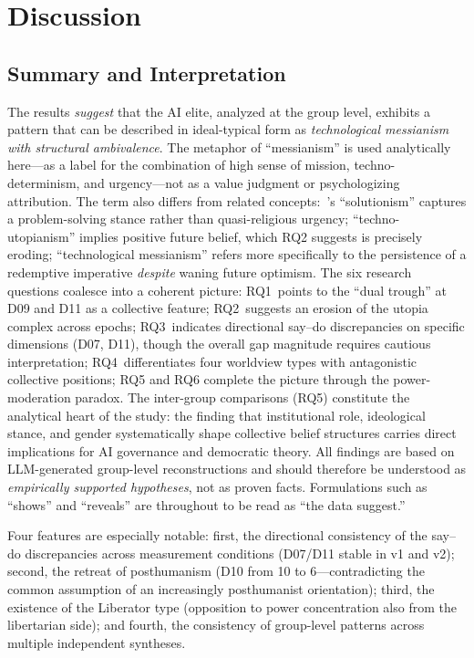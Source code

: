 \documentclass[12pt,a4paper]{article}
\begin{document}
\section{Discussion}
\label{sec:diskussion}

\subsection{Summary and Interpretation}
\label{sec:diskussion:zusammenfassung}

The results \emph{suggest} that the AI elite, analyzed at the group level, exhibits a pattern that can be described in ideal-typical form as \emph{technological messianism with structural ambivalence}. The metaphor of ``messianism'' is used analytically here---as a label for the combination of high sense of mission, techno-determinism, and urgency---not as a value judgment or psychologizing attribution. The term also differs from related concepts:~\citeauthor{Morozov2013}'s ``solutionism'' captures a problem-solving stance rather than quasi-religious urgency; ``techno-utopianism'' implies positive future belief, which RQ2 suggests is precisely eroding; ``technological messianism'' refers more specifically to the persistence of a redemptive imperative \emph{despite} waning future optimism. The six research questions coalesce into a coherent picture: RQ1~points to the ``dual trough'' at D09 and D11 as a collective feature; RQ2~suggests an erosion of the utopia complex across epochs; RQ3~indicates directional say--do discrepancies on specific dimensions (D07, D11), though the overall gap magnitude requires cautious interpretation; RQ4~differentiates four worldview types with antagonistic collective positions; RQ5 and RQ6 complete the picture through the power-moderation paradox. The inter-group comparisons (RQ5) constitute the analytical heart of the study: the finding that institutional role, ideological stance, and gender systematically shape collective belief structures carries direct implications for AI governance and democratic theory. All findings are based on LLM-generated group-level reconstructions and should therefore be understood as \emph{empirically supported hypotheses}, not as proven facts. Formulations such as ``shows'' and ``reveals'' are throughout to be read as ``the data suggest.''

Four features are especially notable: first, the directional consistency of the say--do discrepancies across measurement conditions (D07/D11 stable in v1 and v2); second, the retreat of posthumanism (D10 from 10 to 6---contradicting the common assumption of an increasingly posthumanist orientation); third, the existence of the Liberator type (opposition to power concentration also from the libertarian side); and fourth, the consistency of group-level patterns across multiple independent syntheses.
\end{document}
